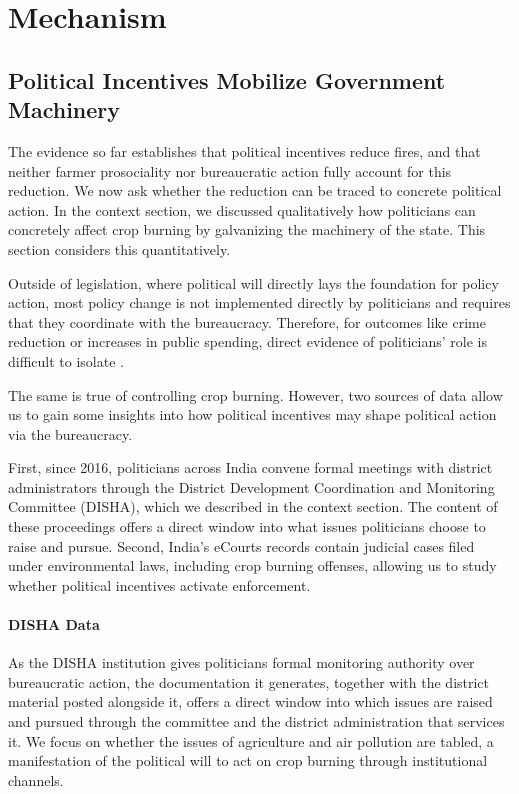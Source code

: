 \documentclass[12pt]{article}
\begin{document}
\section{Mechanism}

\subsection{Political Incentives Mobilize Government Machinery}

The evidence so far establishes that political incentives reduce fires, and that neither farmer prosociality nor bureaucratic action fully account for this reduction. We now ask whether the reduction can be traced to concrete political action. In the context section, we discussed qualitatively how politicians can concretely affect crop burning by galvanizing the machinery of the state. This section considers this quantitatively. 

Outside of legislation, where political will directly lays the foundation for policy action, most policy change is not implemented directly by politicians and requires that they coordinate with the bureaucracy. Therefore, for outcomes like crime reduction or increases in public spending, direct evidence of politicians' role is difficult to isolate \citep{gulzar2017politicians,agnihotri2026bureaucrat}. 

The same is true of controlling crop burning. However, two sources of data allow us to gain some insights into how political incentives may shape political action via the bureaucracy. 

First, since 2016, politicians across India convene formal meetings with district administrators through the District Development Coordination and Monitoring Committee (DISHA), which we described in the context section. The content of these proceedings offers a direct window into what issues politicians choose to raise and pursue. Second, India's eCourts records contain judicial cases filed under environmental laws, including crop burning offenses, allowing us to study whether political incentives activate enforcement.

\paragraph{DISHA Data}
As the DISHA institution gives politicians formal monitoring authority over bureaucratic action, the documentation it generates, together with the district material posted alongside it, offers a direct window into which issues are raised and pursued through the committee and the district administration that services it. We focus on whether the issues of agriculture and air pollution are tabled, a manifestation of the political will to act on crop burning through institutional channels.
\end{document}
